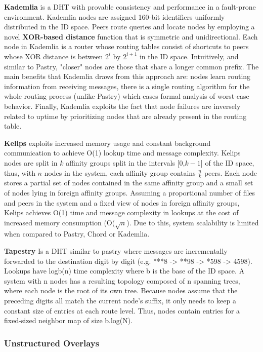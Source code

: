\textbf{Kademlia} \cite{10.1007/3-540-45748-8_5} is a DHT with provable consistency and performance in a fault-prone environment. Kademlia nodes are assigned 160-bit identifiers uniformly distributed in the ID space. Peers route queries and locate nodes by employing a novel \textbf{XOR-based distance} function that is symmetric and unidirectional. Each node in Kademlia is a router whose routing tables consist of shortcuts to peers whose XOR distance is between \(2^{i}\) by \(2^{i + 1}\) in the ID space. Intuitively, and similar to Pastry, "closer" nodes are those that share a longer common prefix. The main benefits that Kademlia draws from this approach are: nodes learn routing information from receiving messages, there is a single routing algorithm for the whole routing process (unlike Pastry) which eases formal analysis of worst-case behavior. Finally, Kademlia exploits the fact that node failures are inversely related to uptime by prioritizing nodes that are already present in the routing table.

\textbf{Kelips} \cite{gupta2003kelips} exploits increased memory usage and constant background communication to achieve O(1) lookup time and message complexity. Kelips nodes are split in $k$ affinity groups split in the intervals [0,$k-1$] of the ID space, thus, with $n$ nodes in the system, each affinity group contains $\frac{n}{k}$ peers. Each node stores a partial set of nodes contained in the same affinity group and a small set of nodes lying in foreign affinity groups. Assuming a proportional number of files and peers in the system and a fixed view of nodes in foreign affinity groups, Kelips achieves O(1) time and message complexity in lookups at the cost of increased memory consumption (O($\sqrt{n}$). Due to this, system scalability is limited when compared to Pastry, Chord or Kademlia. 

\textbf{Tapestry} \cite{tapestry} Is a DHT similar to pastry where messages are incrementally forwarded to the destination digit by digit (e.g. ***8 -> **98 -> *598 -> 4598). Lookups have logb(n) time complexity where b is the base of the ID space. A system with n nodes has a resulting topology composed of n spanning trees, where each node is the root of its own tree. Because nodes assume that the preceding digits all match the current node's suffix, it only needs to keep a constant size of entries at each route level. Thus, nodes contain entries for a fixed-sized neighbor map of size b.log(N). 

\subsubsection{Unstructured Overlays}

